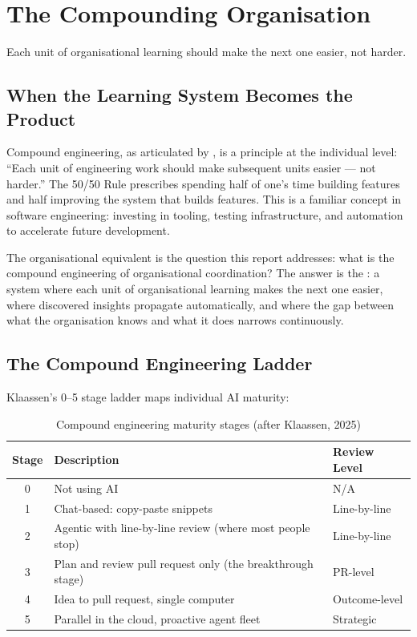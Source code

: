 \chapter{The Compounding Organisation}
\label{ch:compounding-org}

\epigraph{Each unit of organisational learning should make the next one easier, not harder.}{}

\section{When the Learning System Becomes the Product}

Compound engineering, as articulated by \textcite{Klaassen2025}, is a principle at the individual level: ``Each unit of engineering work should make subsequent units easier --- not harder.'' The 50/50 Rule prescribes spending half of one's time building features and half improving the system that builds features. This is a familiar concept in software engineering: investing in tooling, testing infrastructure, and automation to accelerate future development.

The organisational equivalent is the question this report addresses: what is the compound engineering of organisational coordination? The answer is the : a system where each unit of organisational learning makes the next one easier, where discovered insights propagate automatically, and where the gap between what the organisation knows and what it does narrows continuously.

\section{The Compound Engineering Ladder}

Klaassen's 0--5 stage ladder maps individual AI maturity:

\begin{table}[h]
\centering
\caption{Compound engineering maturity stages (after Klaassen, 2025)}
\label{tab:compound-ladder}
\begin{tabularx}{\textwidth}{c X l}
\toprule
\textbf{Stage} & \textbf{Description} & \textbf{Review Level} \\
\midrule
0 & Not using AI & N/A \\
1 & Chat-based: copy-paste snippets & Line-by-line \\
2 & Agentic with line-by-line review (where most people stop) & Line-by-line \\
3 & Plan and review pull request only (the breakthrough stage) & PR-level \\
4 & Idea to pull request, single computer & Outcome-level \\
5 & Parallel in the cloud, proactive agent fleet & Strategic \\
\bottomrule
\end{tabularx}
\end{table}

